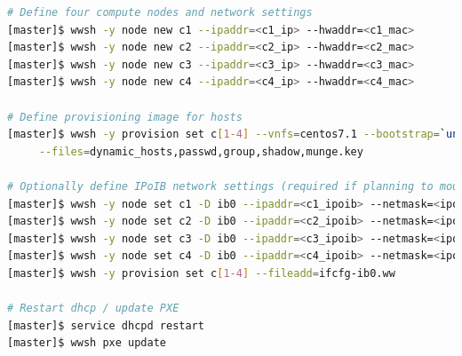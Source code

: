 \documentclass[letterpaper]{article}
\begin{document}
\begin{lstlisting}[language=bash,keywords={},upquote=true,basicstyle=\footnotesize\ttfamily]
# Define four compute nodes and network settings 
[master]$ wwsh -y node new c1 --ipaddr=<c1_ip> --hwaddr=<c1_mac> 
[master]$ wwsh -y node new c2 --ipaddr=<c2_ip> --hwaddr=<c2_mac> 
[master]$ wwsh -y node new c3 --ipaddr=<c3_ip> --hwaddr=<c3_mac> 
[master]$ wwsh -y node new c4 --ipaddr=<c4_ip> --hwaddr=<c4_mac> 

# Define provisioning image for hosts
[master]$ wwsh -y provision set c[1-4] --vnfs=centos7.1 --bootstrap=`uname -r` \
     --files=dynamic_hosts,passwd,group,shadow,munge.key 

# Optionally define IPoIB network settings (required if planning to mount Lustre* over IB)
[master]$ wwsh -y node set c1 -D ib0 --ipaddr=<c1_ipoib> --netmask=<ipoib_netmask>
[master]$ wwsh -y node set c2 -D ib0 --ipaddr=<c2_ipoib> --netmask=<ipoib_netmask>
[master]$ wwsh -y node set c3 -D ib0 --ipaddr=<c3_ipoib> --netmask=<ipoib_netmask>
[master]$ wwsh -y node set c4 -D ib0 --ipaddr=<c4_ipoib> --netmask=<ipoib_netmask>
[master]$ wwsh -y provision set c[1-4] --fileadd=ifcfg-ib0.ww

# Restart dhcp / update PXE
[master]$ service dhcpd restart
[master]$ wwsh pxe update
\end{lstlisting}


\end{document}
